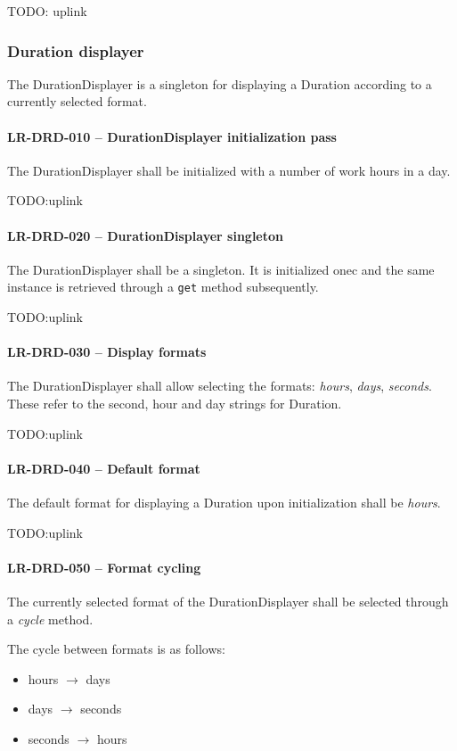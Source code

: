 TODO: uplink
\subsubsection{Duration displayer}
The DurationDisplayer is a singleton for displaying a Duration according
to a currently selected format.

\paragraph{LR-DRD-010 -- DurationDisplayer initialization pass}
The DurationDisplayer shall be initialized with a number of work hours
in a day.

TODO:uplink
\paragraph{LR-DRD-020 -- DurationDisplayer singleton}
The DurationDisplayer shall be a singleton. It is initialized onec and
the same instance is retrieved through a \lstinline{get} method
subsequently.

TODO:uplink
\paragraph{LR-DRD-030 -- Display formats}
The DurationDisplayer shall allow selecting the formats: \emph{hours},
\emph{days}, \emph{seconds}.
These refer to the second, hour and day strings for Duration.

TODO:uplink
\paragraph{LR-DRD-040 -- Default format}
The default format for displaying a Duration upon initialization shall
be \emph{hours}.

TODO:uplink
\paragraph{LR-DRD-050 -- Format cycling}
The currently selected format of the DurationDisplayer shall be selected
through a \emph{cycle} method.

The cycle between formats is as follows:
\begin{itemize}
\item hours $\rightarrow$ days
\item days $\rightarrow$ seconds
\item seconds $\rightarrow$ hours
\end{itemize}

